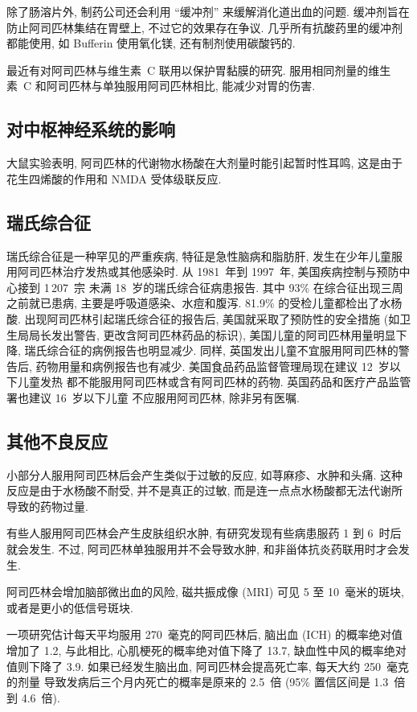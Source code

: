 除了肠溶片外,
制药公司还会利用 ``缓冲剂'' 来缓解消化道出血的问题.
缓冲剂旨在防止阿司匹林集结在胃壁上, 不过它的效果存在争议.
几乎所有抗酸药里的缓冲剂都能使用,
如 Bufferin 使用氧化镁, 还有制剂使用碳酸钙的.

最近有对阿司匹林与维生素~C 联用以保护胃黏膜的研究.
服用相同剂量的维生素~C 和阿司匹林与单独服用阿司匹林相比,
能减少对胃的伤害.

\subsection{对中枢神经系统的影响}

大鼠实验表明, 阿司匹林的代谢物水杨酸在大剂量时能引起暂时性耳鸣,
这是由于花生四烯酸的作用和 NMDA 受体级联反应.

\subsection{瑞氏综合征}

瑞氏综合征是一种罕见的严重疾病, 特征是急性脑病和脂肪肝,
发生在少年儿童服用阿司匹林治疗发热或其他感染时.
从 1981~年到 1997~年,
美国疾病控制与预防中心接到 1\,207~宗%
未满 18~岁的瑞氏综合征病患报告.
其中 93\% 在综合征出现三周之前就已患病,
主要是呼吸道感染、水痘和腹泻.
81.9\% 的受检儿童都检出了水杨酸.
出现阿司匹林引起瑞氏综合征的报告后,
美国就采取了预防性的安全措施
(如卫生局局长发出警告, 更改含阿司匹林药品的标识),
美国儿童的阿司匹林用量明显下降,
瑞氏综合征的病例报告也明显减少.
同样, 英国发出儿童不宜服用阿司匹林的警告后,
药物用量和病例报告也有减少.
美国食品药品监督管理局现在建议 12~岁以下儿童发热%
都不能服用阿司匹林或含有阿司匹林的药物.
英国药品和医疗产品监管署也建议 16~岁以下儿童%
不应服用阿司匹林, 除非另有医嘱.

\subsection{其他不良反应}

小部分人服用阿司匹林后会产生类似于过敏的反应,
如荨麻疹、水肿和头痛.
这种反应是由于水杨酸不耐受, 并不是真正的过敏,
而是连一点点水杨酸都无法代谢所导致的药物过量.

有些人服用阿司匹林会产生皮肤组织水肿,
有研究发现有些病患服药 1 到 6~时后就会发生.
不过, 阿司匹林单独服用并不会导致水肿,
和非甾体抗炎药联用时才会发生.

阿司匹林会增加脑部微出血的风险,
磁共振成像 (MRI) 可见 5 至 10~毫米的斑块,
或者是更小的低信号斑块.

一项研究估计每天平均服用 270~毫克的阿司匹林后,
脑出血 (ICH) 的概率绝对值增加了 1.2\textperthousand,
与此相比, 心肌梗死的概率绝对值下降了 13.7\textperthousand,
缺血性中风的概率绝对值则下降了 3.9\textperthousand.
如果已经发生脑出血, 阿司匹林会提高死亡率,
每天大约 250~毫克的剂量%
导致发病后三个月内死亡的概率是原来的 2.5~倍
(95\% 置信区间是 1.3~倍到 4.6~倍).

